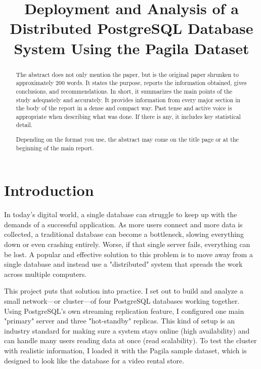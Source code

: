 \documentclass[conference]{IEEEtran}
\begin{document}
\title{Deployment and Analysis of a Distributed PostgreSQL Database System Using the Pagila Dataset}

\author{
}
\date{}

\maketitle

\begin{abstract}
The abstract does not only mention the paper, but is the original paper shrunken to approximately 200 words. It states the purpose, reports the information obtained, gives conclusions, and recommendations. In short, it summarizes the main points of the study adequately and accurately. It provides information from every major section in the body of the report in a dense and compact way. Past tense and active voice is appropriate when describing what was done. If there is any, it includes key statistical detail.  

Depending on the format you use, the abstract may come on the title page or at the beginning of the main report.

\end{abstract}





\section{Introduction}

In today's digital world, a single database can struggle to keep up with the demands of a successful application. As more users connect and more data is collected, a traditional database can become a bottleneck, slowing everything down or even crashing entirely. Worse, if that single server fails, everything can be lost. A popular and effective solution to this problem is to move away from a single database and instead use a "distributed" system that spreads the work across multiple computers.

This project puts that solution into practice. I set out to build and analyze a small network—or cluster—of four PostgreSQL databases working together. Using PostgreSQL's own streaming replication feature, I configured one main "primary" server and three "hot-standby" replicas. This kind of setup is an industry standard for making sure a system stays online (high availability) and can handle many users reading data at once (read scalability). To test the cluster with realistic information, I loaded it with the Pagila sample dataset, which is designed to look like the database for a video rental store.
\end{document}
